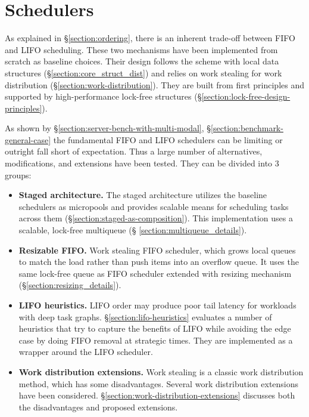 \documentclass[12pt,a4paper,twoside]{report}
\begin{document}
\section{Schedulers}
\label{section:impl-schedulers}
As explained in \S\ref{section:ordering}, there is an inherent trade-off between FIFO and LIFO scheduling. These two mechanisms have been implemented from scratch as baseline choices. Their design follows the scheme with local data structures (\S\ref{section:core_struct_dist}) and relies on work stealing for work distribution (\S\ref{section:work-distribution}). They are built from first principles and supported by high-performance lock-free structures (\S\ref{section:lock-free-design-principles}). 

As shown by \S\ref{section:server-bench-with-multi-modal}, \S\ref{section:benchmark-general-case} the fundamental FIFO and LIFO schedulers can be limiting or outright fall short of expectation. Thus a large number of alternatives, modifications, and extensions have been tested. They can be divided into 3 groups:
\begin{itemize}
    \item \textbf{Staged architecture.} The staged architecture utilizes the baseline schedulers as micropools and provides scalable means for scheduling tasks across them (\S\ref{section:staged-as-composition}). This implementation uses a scalable, lock-free multiqueue (\S
    \ref{section:multiqueue_details}).
    \item \textbf{Resizable FIFO.} Work stealing FIFO scheduler, which grows local queues to match the load rather than push items into an overflow queue. It uses the same lock-free queue as FIFO scheduler extended with resizing mechanism (\S\ref{section:resizing_details}).
    \item \textbf{LIFO heuristics.}  LIFO order may produce poor tail latency for workloads with deep task graphs. \S\ref{section:lifo-heuristics} evaluates a number of heuristics that try to capture the benefits of LIFO while avoiding the edge case by doing FIFO removal at strategic times. They are implemented as a wrapper around the LIFO scheduler.
    \item \textbf{Work distribution extensions.} Work stealing is a classic work distribution method, which has some disadvantages. Several work distribution extensions have been considered. \S\ref{section:work-distribution-extensions} discusses both the disadvantages and proposed extensions. 
\end{itemize} 
\end{document}
